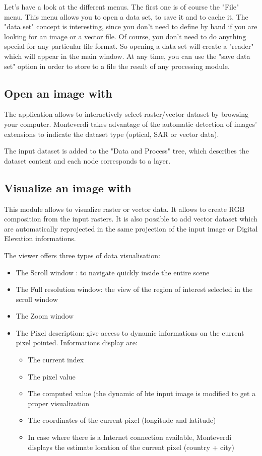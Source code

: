 Let's have a look at the different menus. The first one is of course
the "File" menu. This menu allows you to open a data set, to save it
and to cache it. The "data set" concept is interesting, since you
don't need to define by hand if you are looking for an image or a
vector file. Of course, you don't need to do anything special for any
particular file format. So opening a data set will create a "reader"
which will appear in the main window. At any time, you can use the
"save data set" option in order to store to a file the result of any
processing module.


\subsection{Open an image with \mont}
The application allows to interactively select raster/vector dataset
by browsing your computer. Monteverdi takes advantage of the automatic
detection of images' extensions to indicate the dataset type (optical,
SAR or vector data).

The input dataset is added to the "Data and Process" tree, which
describes the dataset content and each node corresponds to a layer.

\subsection{Visualize an image with \mont}
This module allows to visualize raster or vector data. It allows to
create RGB composition from the input rasters. It is also possible to
add vector dataset which are automatically reprojected in the same
projection of the input image or Digital Elevation informations.

The viewer offers three types of data visualisation: 

\begin{itemize}
\item The Scroll window : to navigate quickly inside the entire scene
\item The Full resolution window: the view of the region of interest
  selected in the scroll window
\item The Zoom window
\item The Pixel description: give access to dynamic informations on
  the current pixel pointed. Informations display are:
  \begin{itemize}
  \item The current index
  \item The pixel value 
  \item The computed value (the dynamic of hte input image is modified
    to get a proper visualization
  \item The coordinates of the current pixel (longitude and latitude)
  \item In case where there is a Internet connection available,
    Monteverdi displays the estimate location of the current pixel
    (country + city)
  \end{itemize} 
\end{itemize}

